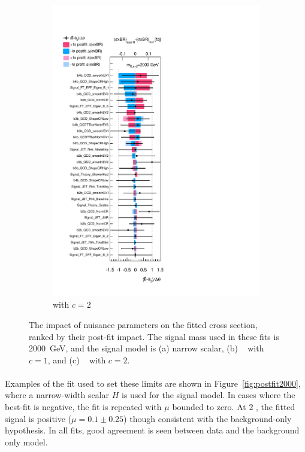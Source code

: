 \begin{figure}[htb!]
\begin{subfigure}[b]{0.31\textwidth}
        \includegraphics[width=\textwidth]{figures/boosted/results/ranking_okt18_g20_2000.pdf}
        \caption{\Grav with $c=2$}
        \label{fig:ranking2000-g2}
    \end{subfigure}
  \caption{The impact of nuisance parameters on the fitted cross section, ranked by their post-fit impact. The signal mass used in these fits is 2000~GeV, and the signal model is (a) narrow scalar, (b) \Grav~ with $c=1$, and (c) \Grav~ with $c=2$.}
  \label{fig:ranking2000}
\end{figure}


\paragraph{}
Examples of the fit used to set these limits are shown in Figure~\ref{fig:postfit2000}, where a narrow-width scalar $H$ is used for the signal model. 
In cases where the best-fit is negative, the fit is repeated with $\mu$ bounded to zero. 
At $2$ \TeV, the fitted signal is positive ($\mu=0.1\pm0.25$) though consistent with the background-only hypothesis.
In all fits, good agreement is seen between data and the background only model.


